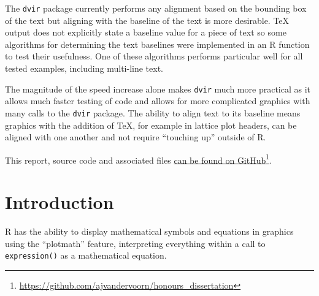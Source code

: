 \documentclass[]{article}
\newenvironment{Shaded}{\begin{snugshade}}{\end{snugshade}}
\newcommand{\KeywordTok}[1]{\textcolor[rgb]{0.13,0.29,0.53}{\textbf{#1}}}
\newcommand{\DataTypeTok}[1]{\textcolor[rgb]{0.13,0.29,0.53}{#1}}
\newcommand{\DecValTok}[1]{\textcolor[rgb]{0.00,0.00,0.81}{#1}}
\newcommand{\StringTok}[1]{\textcolor[rgb]{0.31,0.60,0.02}{#1}}
\newcommand{\OperatorTok}[1]{\textcolor[rgb]{0.81,0.36,0.00}{\textbf{#1}}}
\newcommand{\NormalTok}[1]{#1}
\begin{document}
The \texttt{dvir} package currently performs any alignment based on the
bounding box of the text but aligning with the baseline of the text is
more desirable. \TeX{} output does not explicitly state a baseline value
for a piece of text so some algorithms for determining the text
baselines were implemented in an R function to test their usefulness.
One of these algorithms performs particular well for all tested
examples, including multi-line text.

The magnitude of the speed increase alone makes \texttt{dvir} much more
practical as it allows much faster testing of code and allows for more
complicated graphics with many calls to the \texttt{dvir} package. The
ability to align text to its baseline means graphics with the addition
of \TeX{}, for example in lattice plot headers, can be aligned with one
another and not require ``touching up'' outside of R.

This report, source code and associated files
\href{https://github.com/ajvandervoorn/honours_dissertation}{can be
found on GitHub}\footnote{\url{https://github.com/ajvandervoorn/honours_dissertation}}.

\newpage{}

\section{Introduction}\label{introduction}

R has the ability to display mathematical symbols and equations in
graphics using the ``plotmath'' feature, interpreting everything within
a call to \texttt{expression()} as a mathematical equation.

\begin{Shaded}
\end{Shaded}
\end{document}
